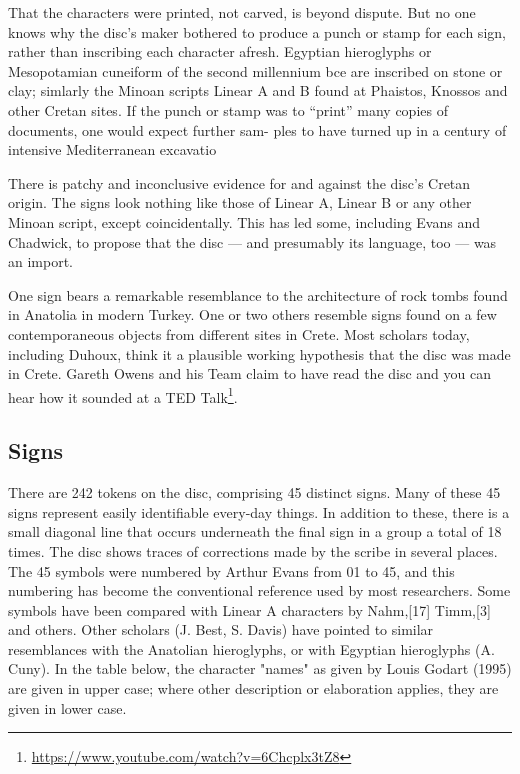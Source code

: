 That the characters were printed, not carved,
is beyond dispute. But no one knows why the disc’s maker bothered to produce a punch or stamp for each sign, rather than inscribing each character afresh. Egyptian hieroglyphs or Mesopotamian cuneiform of the second
millennium bce are inscribed on stone or clay;
simlarly the Minoan scripts Linear A and B found
at Phaistos, Knossos and other Cretan sites. If
the punch or stamp was to \enquote{print} many copies of documents, one would expect further sam-
ples to have turned up in a century of intensive Mediterranean excavatio

There is patchy and inconclusive evidence for and against the disc’s Cretan origin. The
signs look nothing like those of Linear A, Linear B or any other Minoan script, except coincidentally. This has led some, including Evans and Chadwick, to propose that the disc — and presumably its language, too — was an import.

One sign bears a remarkable resemblance to the architecture of rock tombs found in Anatolia in modern Turkey. One or two others
resemble signs found on a few contemporaneous objects from different sites in Crete. Most
scholars today, including Duhoux, think it a plausible working hypothesis that the disc was made in Crete. Gareth Owens and his Team claim to have read the disc and you can hear how it sounded at a TED Talk\footnote{\url{https://www.youtube.com/watch?v=6Chcplx3tZ8}}.



\subsection{Signs}

There are 242 tokens on the disc, comprising 45 distinct signs. Many of these 45 signs represent easily identifiable every-day things. In addition to these, there is a small diagonal line that occurs underneath the final sign in a group a total of 18 times. The disc shows traces of corrections made by the scribe in several places. The 45 symbols were numbered by Arthur Evans from 01 to 45, and this numbering has become the conventional reference used by most researchers. Some symbols have been compared with Linear A characters by Nahm,[17] Timm,[3] and others. Other scholars (J. Best, S. Davis) have pointed to similar resemblances with the Anatolian hieroglyphs, or with Egyptian hieroglyphs (A. Cuny). In the table below, the character "names" as given by Louis Godart (1995) are given in upper case; where other description or elaboration applies, they are given in lower case.




